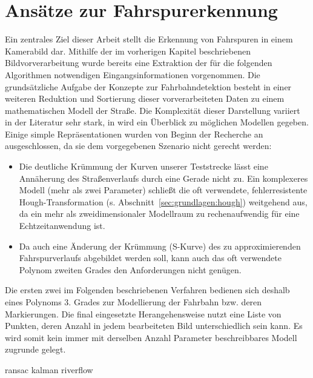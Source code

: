 \chapter{Ansätze zur Fahrspurerkennung \dcsecondauthorshort}
\label{cha:fahrspurerkennung}
Ein zentrales Ziel dieser Arbeit stellt die Erkennung von Fahrspuren in einem Kamerabild dar. Mithilfe der im vorherigen Kapitel beschriebenen Bildvorverarbeitung wurde bereits eine Extraktion der für die folgenden Algorithmen notwendigen Eingangsinformationen vorgenommen. Die grundsätzliche Aufgabe der Konzepte zur Fahrbahndetektion besteht in einer weiteren Reduktion und Sortierung dieser vorverarbeiteten Daten zu einem mathematischen Modell der Straße. Die Komplexität dieser Darstellung variiert in der Literatur sehr stark, in \autocite{naroteReviewRecentAdvances2018} wird ein Überblick zu möglichen Modellen gegeben. Einige simple Repräsentationen wurden von Beginn der Recherche an ausgeschlossen, da sie dem vorgegebenen Szenario nicht gerecht werden: 
\begin{itemize}
\item Die deutliche Krümmung der Kurven unserer Teststrecke lässt eine Annäherung des Straßenverlaufs durch eine Gerade nicht zu. Ein komplexeres Modell (mehr als zwei Parameter) schließt die oft verwendete, fehlerresistente Hough-Transformation (s. Abschnitt~\ref{sec:grundlagen:hough}) weitgehend aus, da ein mehr als zweidimensionaler Modellraum zu rechenaufwendig für eine Echtzeitanwendung ist. 
\item Da auch eine Änderung der Krümmung (S-Kurve) des zu approximierenden Fahrspurverlaufs abgebildet werden soll, kann auch das oft verwendete Polynom zweiten Grades den Anforderungen nicht genügen. 
\end{itemize}
Die ersten zwei im Folgenden beschriebenen Verfahren bedienen sich deshalb eines Polynoms 3. Grades zur Modellierung der Fahrbahn bzw. deren Markierungen. Die final eingesetzte Herangehensweise nutzt eine Liste von Punkten, deren Anzahl in jedem bearbeiteten Bild unterschiedlich sein kann. Es wird somit kein immer mit derselben Anzahl Parameter beschreibbares Modell zugrunde gelegt. 

{ransac}
{kalman}
{riverflow}
